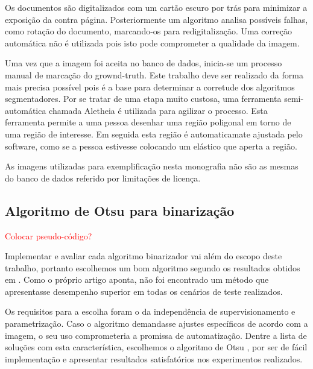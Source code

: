 \documentclass[a4paper,11pt]{article}
\newcommand{\TODO}[1]{\textcolor{red}{#1}}
\begin{document}
      Os documentos são digitalizados com um cartão escuro por trás para minimizar a exposição da contra página. Posteriormente um algoritmo analisa possíveis falhas, como rotação do documento, marcando-os para redigitalização. Uma correção automática não é utilizada pois isto pode comprometer a qualidade da imagem.

      Uma vez que a imagem foi aceita no banco de dados, inicia-se um processo manual de marcação do grownd-truth. Este trabalho deve ser realizado da forma mais precisa possível pois é a base para determinar a corretude dos algoritmos segmentadores. Por se tratar de uma etapa muito custosa, uma ferramenta semi-automática chamada Aletheia é utilizada para agilizar o processo. Esta ferramenta permite a uma pessoa desenhar uma região poligonal em torno de uma região de interesse. Em seguida esta região é automaticamate ajustada pelo software, como se a pessoa estivesse colocando um elástico que aperta a região.

      As imagens utilizadas para exemplificação nesta monografia não são as mesmas do banco de dados referido por limitações de licença.

    \subsection{Algoritmo de Otsu para binarização}

      \TODO{Colocar pseudo-código?}


      Implementar e avaliar cada algoritmo binarizador vai além do escopo deste trabalho, portanto escolhemos um bom algoritmo segundo os resultados obtidos em \cite{citeulike:890354}. Como o próprio artigo aponta, não foi encontrado um método que apresentasse desempenho superior em todas os cenários de teste realizados.

      Os requisitos para a escolha foram o da independência de supervisionamento e parametrização. Caso o algoritmo demandasse ajustes específicos de acordo com a imagem, o seu uso comprometeria a promissa de automatização. Dentre a lista de soluções com esta característica, escolhemos o algoritmo de Otsu \cite{1979:ots}, por ser de fácil implementação e apresentar resultados satisfatórios nos experimentos realizados.
\end{document}
